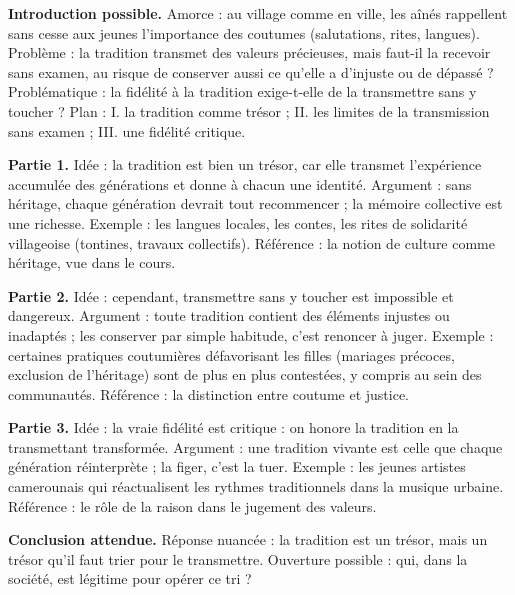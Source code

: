 \documentclass[11pt]{article}
\begin{document}
\begin{corrige}
\textbf{Introduction possible.} Amorce : au village comme en ville, les aînés rappellent sans cesse aux jeunes l'importance des coutumes (salutations, rites, langues). Problème : la tradition transmet des valeurs précieuses, mais faut-il la recevoir sans examen, au risque de conserver aussi ce qu'elle a d'injuste ou de dépassé ? Problématique : la fidélité à la tradition exige-t-elle de la transmettre sans y toucher ? Plan : I. la tradition comme trésor ; II. les limites de la transmission sans examen ; III. une fidélité critique.

\textbf{Partie 1.} Idée : la tradition est bien un trésor, car elle transmet l'expérience accumulée des générations et donne à chacun une identité. Argument : sans héritage, chaque génération devrait tout recommencer ; la mémoire collective est une richesse. Exemple : les langues locales, les contes, les rites de solidarité villageoise (tontines, travaux collectifs). Référence : la notion de culture comme héritage, vue dans le cours.

\textbf{Partie 2.} Idée : cependant, transmettre \og sans y toucher\fg{} est impossible et dangereux. Argument : toute tradition contient des éléments injustes ou inadaptés ; les conserver par simple habitude, c'est renoncer à juger. Exemple : certaines pratiques coutumières défavorisant les filles (mariages précoces, exclusion de l'héritage) sont de plus en plus contestées, y compris au sein des communautés. Référence : la distinction entre coutume et justice.

\textbf{Partie 3.} Idée : la vraie fidélité est critique : on honore la tradition en la transmettant transformée. Argument : une tradition vivante est celle que chaque génération réinterprète ; la figer, c'est la tuer. Exemple : les jeunes artistes camerounais qui réactualisent les rythmes traditionnels dans la musique urbaine. Référence : le rôle de la raison dans le jugement des valeurs.

\textbf{Conclusion attendue.} Réponse nuancée : la tradition est un trésor, mais un trésor qu'il faut trier pour le transmettre. Ouverture possible : qui, dans la société, est légitime pour opérer ce tri ?
\end{corrige}
\end{document}

